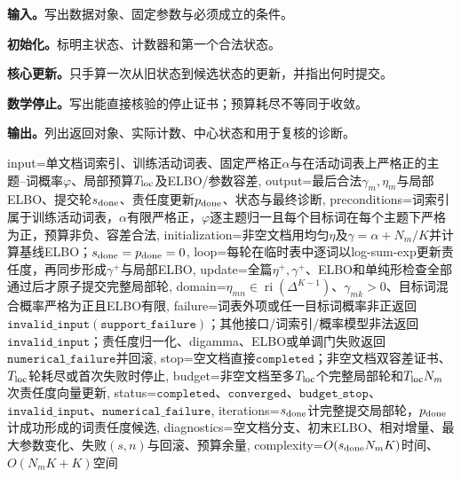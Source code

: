\begin{keypointbox}[title={算法执行契约：五步阅读}]
\textbf{输入。}写出数据对象、固定参数与必须成立的条件。\par
\textbf{初始化。}标明主状态、计数器和第一个合法状态。\par
\textbf{核心更新。}只手算一次从旧状态到候选状态的更新，并指出何时提交。\par
\textbf{数学停止。}写出能直接核验的停止证书；预算耗尽不等同于收敛。\par
\textbf{输出。}列出返回对象、实际计数、中心状态和用于复核的诊断。
\end{keypointbox}

\begin{AlgorithmContract}{
  input={单文档词索引、训练活动词表、固定严格正$\alpha$与在活动词表上严格正的主题--词概率$\varphi$、局部预算$T_{\rm loc}$及ELBO/参数容差},
  output={最后合法$\gamma_m,\eta_m$与局部ELBO、提交轮$s_{\rm done}$、责任度更新$p_{\rm done}$、状态与最终诊断},
  preconditions={词索引属于训练活动词表，$\alpha$有限严格正，$\varphi$逐主题归一且每个目标词在每个主题下严格为正，预算非负、容差合法},
  initialization={非空文档用均匀$\eta$及$\gamma=\alpha+N_m/K$并计算基线ELBO；$s_{\rm done}=p_{\rm done}=0$},
  loop={每轮在临时表中逐词以log-sum-exp更新责任度，再同步形成$\gamma^+$与局部ELBO},
  update={全篇$\eta^+,\gamma^+$、ELBO和单纯形检查全部通过后才原子提交完整局部轮},
  domain={$\eta_{mn}\in\operatorname{ri}(\Delta^{K-1})$、$\gamma_{mk}>0$、目标词混合概率严格为正且ELBO有限},
  failure={词表外项或任一目标词概率非正返回$\mathtt{invalid\_input}(\mathtt{support\_failure})$；其他接口/词索引/概率模型非法返回$\mathtt{invalid\_input}$；责任度归一化、digamma、ELBO或单调门失败返回$\mathtt{numerical\_failure}$并回滚},
  stop={空文档直接$\mathtt{completed}$；非空文档双容差证书、$T_{\rm loc}$轮耗尽或首次失败时停止},
  budget={非空文档至多$T_{\rm loc}$个完整局部轮和$T_{\rm loc}N_m$次责任度向量更新},
  status={$\mathtt{completed}$、$\mathtt{converged}$、$\mathtt{budget\_stop}$、$\mathtt{invalid\_input}$、$\mathtt{numerical\_failure}$},
  iterations={$s_{\rm done}$计完整提交局部轮，$p_{\rm done}$计成功形成的词责任度候选},
  diagnostics={空文档分支、初末ELBO、相对增量、最大参数变化、失败$(s,n)$与回滚、预算余量},
  complexity={$O(s_{\rm done}N_mK)$时间、$O(N_mK+K)$空间}
}
\label{alg:V5-C06-local-vi}
\end{AlgorithmContract}

